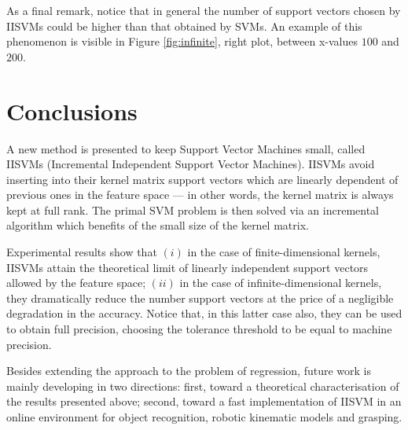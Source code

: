 \documentclass[10pt,twocolumn,letterpaper]{article}
\begin{document}
As a final remark, notice that in general the number of support
vectors chosen by IISVMs could be higher than that obtained by
SVMs. An example of this phenomenon is visible in Figure
\ref{fig:infinite}, right plot, between x-values $100$ and $200$.

\section{Conclusions}
\label{sec:concl}

A new method is presented to keep Support Vector Machines small,
called IISVMs (Incremental Independent Support Vector
Machines). IISVMs avoid inserting into their kernel matrix support
vectors which are linearly dependent of previous ones in the feature
space --- in other words, the kernel matrix is always kept at full
rank. The primal SVM problem is then solved via an incremental
algorithm which benefits of the small size of the kernel matrix.

Experimental results show that $(i)$ in the case of finite-dimensional
kernels, IISVMs attain the theoretical limit of linearly independent
support vectors allowed by the feature space; $(ii)$ in the case of
infinite-dimensional kernels, they dramatically reduce the number
support vectors at the price of a negligible degradation in the
accuracy. Notice that, in this latter case also, they can be used to
obtain full precision, choosing the tolerance threshold to be equal to
machine precision.

Besides extending the approach to the problem of regression, future
work is mainly developing in two directions: first, toward a
theoretical characterisation of the results presented above; second,
toward a fast implementation of IISVM in an online environment for
object recognition, robotic kinematic models and grasping.


{\small


}
\end{document}
